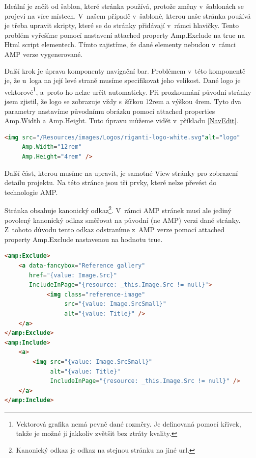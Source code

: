 Ideální je začít od šablon, které stránka používá, protože změny v~šablonách se projeví na více místech. V~našem případě v~šabloně, kterou naše stránka používá je třeba upravit skripty, které se do stránky přidávají v~rámci hlavičky. Tento problém vyřešíme pomocí nastavení attached property Amp.Exclude na true na Html script elementech. Tímto zajistíme, že dané elementy nebudou v~rámci AMP verze vygenerované.

Další krok je úprava komponenty navigační bar. Problémem v~této komponentě je, že u~loga na její levé straně musíme specifikovat jeho velikost. Dané logo je vektorové\footnote{Vektorová grafika nemá pevně dané rozměry. Je definovaná pomocí křivek, takže je možné ji jakkoliv zvětšit bez ztráty kvality.}, a~proto ho nelze určit automaticky. Při prozkoumání původní stránky jsem zjistil, že logo se zobrazuje vždy s~šířkou 12rem a výškou 4rem. Tyto dva parametry nastavíme původnímu obrázku pomocí attached properties Amp.Width a Amp.Height. Tuto úpravu můžeme vidět v~příkladu \ref{NavEdit}.
\begin{lstlisting}[language=html, caption=Upřesnění velikosti obrázku.,label=NavEdit,captionpos=t]
<img src="/Resources/images/Logos/riganti-logo-white.svg"alt="logo"
     Amp.Width="12rem"
     Amp.Height="4rem" />
\end{lstlisting}

Další část, kterou musíme na upravit, je samotné View stránky pro zobrazení detailu projektu. Na této stránce jsou tři prvky, které nelze převést do technologie AMP.

Stránka obsahuje kanonický odkaz\footnote{Kanonický odkaz je odkaz na stejnou stránku na jiné url.}. V~rámci AMP stránek musí ale jediný povolený kanonický odkaz směřovat na původní (ne AMP) verzi dané stránky. Z~tohoto důvodu tento odkaz odstraníme z~AMP verze pomocí attached property Amp.Exclude nastavenou na hodnotu true.

\begin{lstlisting}[language=html, caption=Odstranění komponenty fancybox.,label=fancybox,captionpos=t]
<amp:Exclude>
	<a data-fancybox="Reference gallery"
	   href="{value: Image.Src}"
	   IncludeInPage="{resource: _this.Image.Src != null}">
	        <img class="reference-image"
	             src="{value: Image.SrcSmall}"
	             alt="{value: Title}" />
	</a>
</amp:Exclude>
<amp:Include>
	<a>
		<img src="{value: Image.SrcSmall}"
		     alt="{value: Title}"
		     IncludeInPage="{resource: _this.Image.Src != null}" />
	</a>
</amp:Include>

\end{lstlisting}

